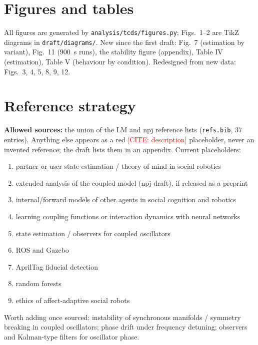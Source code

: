 \documentclass[10pt,a4paper]{article}
\newcommand{\cneed}[1]{\textcolor{red}{[CITE: #1]}}
\begin{document}
\section{Figures and tables}
All figures are generated by \texttt{analysis/tcds/figures.py}; Figs.~1--2 are TikZ diagrams in \texttt{draft/diagrams/}. New since the first draft: Fig.~7 (estimation by variant), Fig.~11 (900~s runs), the stability figure (appendix), Table IV (estimation), Table V (behaviour by condition). Redesigned from new data: Figs.~3, 4, 5, 8, 9, 12.

\section{Reference strategy}
\textbf{Allowed sources:} the union of the LM and npj reference lists (\texttt{refs.bib}, 37 entries). Anything else appears as a red \cneed{description} placeholder, never an invented reference; the draft lists them in an appendix. Current placeholders:
\begin{enumerate}[leftmargin=1.6em]
\item partner or user state estimation / theory of mind in social robotics
\item extended analysis of the coupled model (npj draft), if released as a preprint
\item internal/forward models of other agents in social cognition and robotics
\item learning coupling functions or interaction dynamics with neural networks
\item state estimation / observers for coupled oscillators
\item ROS and Gazebo
\item AprilTag fiducial detection
\item random forests
\item ethics of affect-adaptive social robots
\end{enumerate}
Worth adding once sourced: instability of synchronous manifolds / symmetry breaking in coupled oscillators; phase drift under frequency detuning; observers and Kalman-type filters for oscillator phase.
\end{document}
